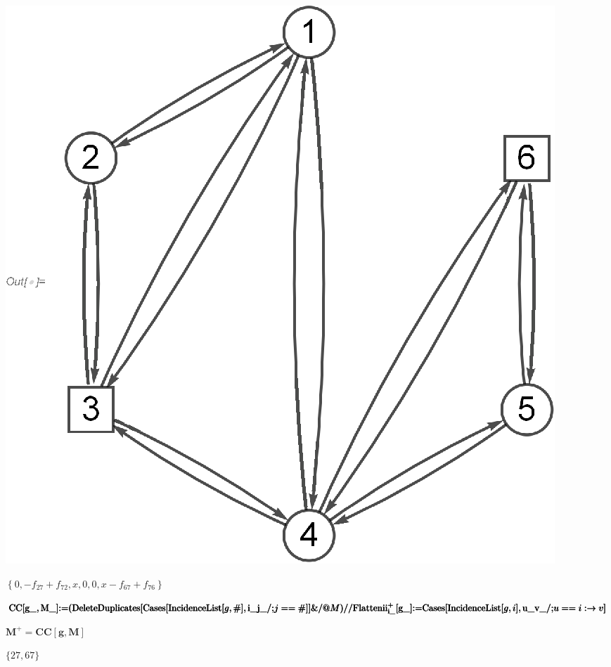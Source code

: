 \documentclass{article}
\newcommand{\unicode}[1]{{}}
\begin{document}
\includegraphics{k1_gr2.eps}

\begin{doublespace}
\noindent\(\left\{0,-f_{2\unicode{f3d5}7}+f_{7\unicode{f3d5}2},x,0,0,x-f_{6\unicode{f3d5}7}+f_{7\unicode{f3d5}6}\right\}\)
\end{doublespace}

\begin{doublespace}
\noindent\(\pmb{\text{CC}[\text{g$\_$},\text{M$\_$}]\text{:=}(\text{DeleteDuplicates}[\text{Cases}[\text{IncidenceList}[g,\#],\text{i$\_$}\unicode{f3d5}\text{j$\_$}\text{/;}j==\#]]\&\text{/@}M)\text{//}\text{Flatten}}\\
\pmb{}\\
\pmb{\text{ii}_{\text{i$\_$}}^+[\text{g$\_$}]\text{:=}\text{Cases}[\text{IncidenceList}[g,i],\text{u$\_$}\unicode{f3d5}\text{v$\_$}\text{/;}u==i:\to
v]}\)
\end{doublespace}

\begin{doublespace}
\noindent\(\pmb{M^+=\text{CC}[g,M]}\)
\end{doublespace}

\begin{doublespace}
\noindent\(\{2\unicode{f3d5}7,6\unicode{f3d5}7\}\)
\end{doublespace}
\end{document}
